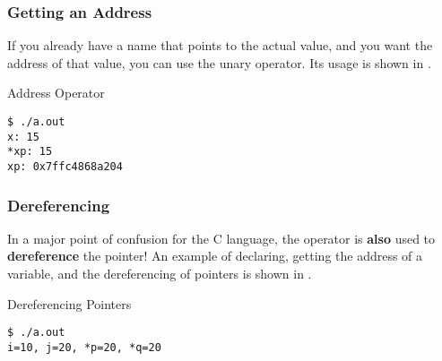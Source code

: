 \subsubsection{Getting an Address}\label{subsubsec:Getting_an_Address}
If you already have a name that points to the actual value, and you want the address of that value, you can use the \cinline{&} unary operator.
Its usage is shown in .
\begin{listing}[h!tbp]
\caption{Address \cinline{&} Operator}
\label{lst:Address_Operator}
\begin{verbatim}
$ ./a.out
x: 15
*xp: 15
xp: 0x7ffc4868a204
\end{verbatim}
\end{listing}

\subsubsection{Dereferencing}\label{subsubsec:Dereferencing_Pointers}
In a major point of confusion for the C language, the \cinline{*} operator is \textbf{also} used to \textbf{dereference} the pointer!
An example of declaring, getting the address of a variable, and the dereferencing of pointers is shown in .
\begin{listing}[h!tbp]
\caption{Dereferencing Pointers}
\label{lst:Dereferencing_Pointers}

\begin{verbatim}
$ ./a.out
i=10, j=20, *p=20, *q=20
\end{verbatim}
\end{listing}


